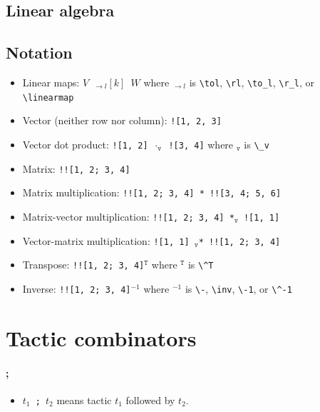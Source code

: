 \documentclass[a4paper]{article}
\begin{document}
\subsection{Linear algebra}

\subsection*{Notation}

\newcommand{\dv}{$\cdot_\mathtt{v}$}
\newcommand{\ov}{*$_\mathtt{v}$}
\newcommand{\vo}{$_\mathtt{v}$*}
\newcommand{\tp}{$^\mathtt{T}$}

\begin{itemize}
    \item Linear maps: \texttt{$V$ $_{\to l}[k]$ $W$} where $_{\to l}$ is \verb|\tol|, \verb|\rl|, \verb|\to_l|, \verb|\r_l|, or \verb|\linearmap|
    \item Vector (neither row nor column): \texttt{![1, 2, 3]}
    \item Vector dot product: \texttt{![1, 2] \dv{} ![3, 4]} where $_\mathtt{v}$ is \verb|\_v|
    \item Matrix: \texttt{!![1, 2; 3, 4]}
    \item Matrix multiplication: \texttt{!![1, 2; 3, 4] * !![3, 4; 5, 6]}
    \item Matrix-vector multiplication: \texttt{!![1, 2; 3, 4] \ov{} ![1, 1]}
    \item Vector-matrix multiplication: \texttt{![1, 1] \vo{} !![1, 2; 3, 4]}
    \item Transpose: \texttt{!![1, 2; 3, 4]\tp} where \tp{} is \verb|\^T|
    \item Inverse: \texttt{!![1, 2; 3, 4]$^{-1}$} where $^{-1}$ is \verb|\-|, \verb|\inv|, \verb|\-1|, or \verb|\^-1|
\end{itemize}

\section{Tactic combinators}

\paragraph{;}

\begin{itemize}
    \item \texttt{$t_1$ ; $t_2$} means tactic $t_1$ followed by $t_2$.
\end{itemize}
\end{document}
